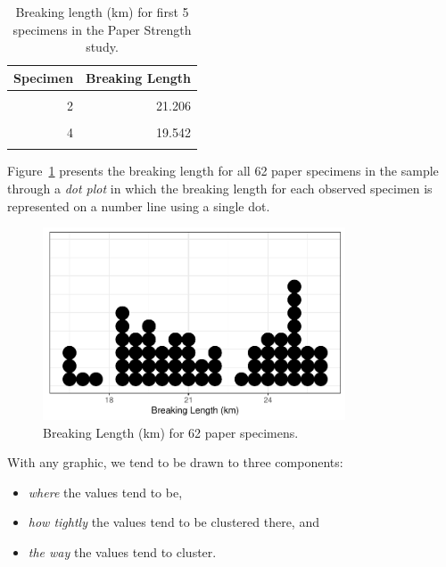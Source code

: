\documentclass[
  letterpaper,
  DIV=11,
  numbers=noendperiod]{scrreprt}
\providecommand{\tightlist}{%
  \setlength{\itemsep}{0pt}\setlength{\parskip}{0pt}}\usepackage{longtable,booktabs,array}
\theoremstyle{definition}
\theoremstyle{definition}
\theoremstyle{plain}
\theoremstyle{remark}
\begin{document}
\hypertarget{tbl-summaries-paper-table}{}
\begin{table}
\caption{\label{tbl-summaries-paper-table}Breaking length (km) for first 5 specimens in the Paper Strength study. }\tabularnewline

\centering
\begin{tabular}[t]{rr}
\toprule
Specimen & Breaking Length\\
\midrule
\cellcolor{gray!6}{1} & \cellcolor{gray!6}{21.312}\\
2 & 21.206\\
\cellcolor{gray!6}{3} & \cellcolor{gray!6}{20.709}\\
4 & 19.542\\
\cellcolor{gray!6}{5} & \cellcolor{gray!6}{20.449}\\
\bottomrule
\end{tabular}
\end{table}

Figure~\ref{fig-summaries-paper-dotplot} presents the breaking length
for all 62 paper specimens in the sample through a \emph{dot plot} in
which the breaking length for each observed specimen is represented on a
number line using a single dot.

\begin{figure}

{\centering \includegraphics[width=0.8\textwidth,height=\textheight]{./images/fig-summaries-paper-dotplot-1.pdf}

}

\caption{\label{fig-summaries-paper-dotplot}Breaking Length (km) for 62
paper specimens.}

\end{figure}

With any graphic, we tend to be drawn to three components:

\begin{itemize}
\tightlist
\item
  \emph{where} the values tend to be,
\item
  \emph{how tightly} the values tend to be clustered there, and
\item
  \emph{the way} the values tend to cluster.
\end{itemize}
\end{document}
